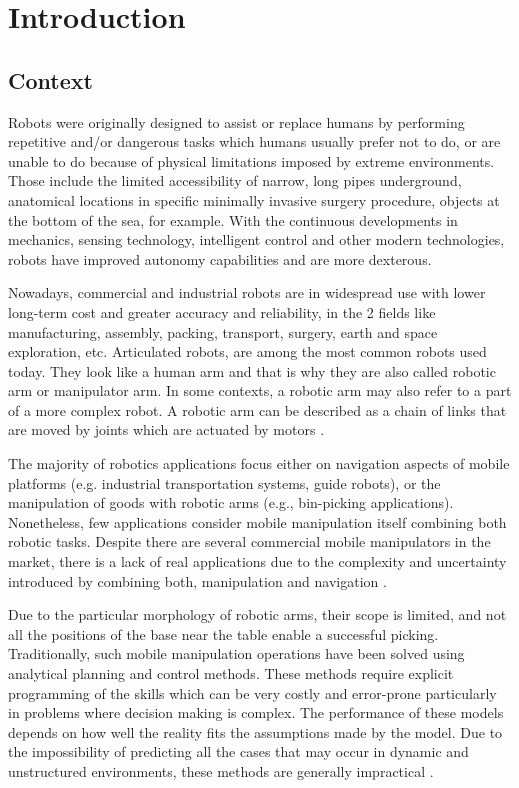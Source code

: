 
\chapter{Introduction}

\section{Context}

Robots were originally designed to assist or replace humans by performing repetitive
and/or dangerous tasks which humans usually prefer not to do, or are unable to do
because of physical limitations imposed by extreme environments. Those include the
limited accessibility of narrow, long pipes underground, anatomical locations in specific
minimally invasive surgery procedure, objects at the bottom of the sea, for example.
With the continuous developments in mechanics, sensing technology, intelligent control
and other modern technologies, robots have improved autonomy capabilities and are
more dexterous.

Nowadays, commercial and industrial robots are in widespread use with
lower long-term cost and greater accuracy and reliability, in the 2 fields like manufacturing,
assembly, packing, transport, surgery, earth and space exploration, etc.
Articulated robots, are among the most common robots used today. They look like a human arm and
that is why they are also called robotic arm or manipulator arm. In some contexts,
a robotic arm may also refer to a part of a more complex robot. A robotic arm can be
described as a chain of links that are moved by joints which are actuated by motors \cite{liu2021deep}.

The majority of robotics applications focus either on navigation aspects of mobile platforms
(e.g. industrial transportation systems, guide robots), or the manipulation of goods
with robotic arms (e.g., bin-picking applications). Nonetheless, few applications consider mobile manipulation
itself combining both robotic tasks. Despite there are several commercial mobile manipulators
in the market, there is a lack of real applications due to the complexity and uncertainty introduced
by combining both, manipulation and navigation \cite{liu2021deep}.

Due to the particular morphology of robotic arms, their scope is limited, and not all the positions of the
base near the table enable a successful picking. Traditionally, such mobile manipulation operations have
been solved using analytical planning and control methods. These methods require explicit programming of the
skills which can be very costly and error-prone particularly in problems where decision making is complex.
The performance of these models depends on how well the reality fits the assumptions made by the model.
Due to the impossibility of predicting all the cases that may occur in dynamic
and unstructured environments, these methods are generally impractical \cite{liu2021deep}.

